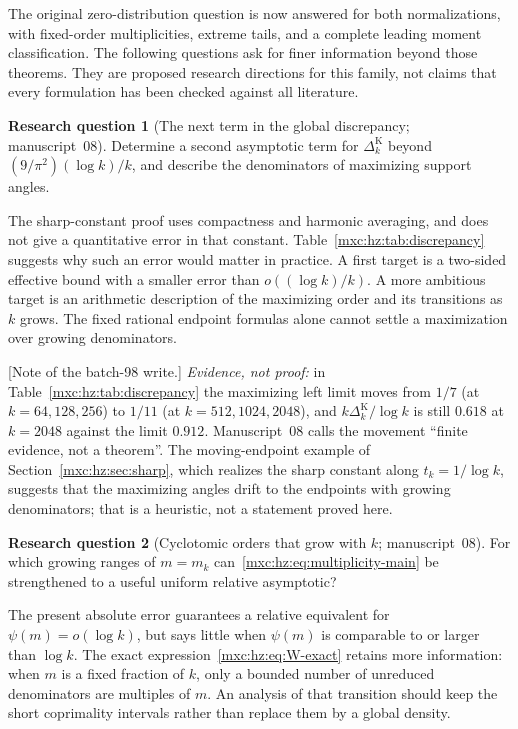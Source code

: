 \documentclass[11pt]{article}
\numberwithin{equation}{section}
\theoremstyle{definition}
\newtheorem{question}{Research question}
\theoremstyle{remark}
\begin{document}
The original zero-distribution question is now answered for both
normalizations, with fixed-order multiplicities, extreme tails, and a
complete leading moment classification. The following questions ask for
finer information beyond those theorems. They are proposed research
directions for this family, not claims that every formulation has been
checked against all literature.

\begin{question}[The next term in the global discrepancy; manuscript~08]\label{mxc:hz:q:discrepancy}
Determine a second asymptotic term for $\Delta^{\mathrm K}_k$ beyond
$(9/\pi^2)(\log k)/k$, and describe the denominators of maximizing support
angles.
\end{question}

The sharp-constant proof uses compactness and harmonic averaging, and does
not give a quantitative error in that constant.
Table~\ref{mxc:hz:tab:discrepancy} suggests why such an error would matter
in practice. A first target is a two-sided effective bound with a smaller
error than $o((\log k)/k)$. A more ambitious target is an arithmetic
description of the maximizing order and its transitions as $k$ grows. The
fixed rational endpoint formulas alone cannot settle a maximization over
growing denominators.

[Note of the batch-98 write.] \emph{Evidence, not proof:} in
Table~\ref{mxc:hz:tab:discrepancy} the maximizing left limit moves from
$1/7$ (at $k=64,128,256$) to $1/11$ (at $k=512,1024,2048$), and
$k\Delta^{\mathrm K}_k/\log k$ is still $0.618$ at $k=2048$ against the
limit $0.912$. Manuscript~08 calls the movement ``finite evidence, not a
theorem''. The moving-endpoint example of
Section~\ref{mxc:hz:sec:sharp}, which realizes the sharp constant along
$t_k=1/\log k$, suggests that the maximizing angles drift to the endpoints
with growing denominators; that is a heuristic, not a statement proved
here.

\begin{question}[Cyclotomic orders that grow with $k$; manuscript~08]\label{mxc:hz:q:growing-order}
For which growing ranges of $m=m_k$ can~\eqref{mxc:hz:eq:multiplicity-main}
be strengthened to a useful uniform relative asymptotic?
\end{question}

The present absolute error guarantees a relative equivalent for
$\psi(m)=o(\log k)$, but says little when $\psi(m)$ is comparable to or
larger than $\log k$. The exact expression~\eqref{mxc:hz:eq:W-exact}
retains more information: when $m$ is a fixed fraction of $k$, only a
bounded number of unreduced denominators are multiples of $m$. An analysis
of that transition should keep the short coprimality intervals rather
than replace them by a global density.
\end{document}
